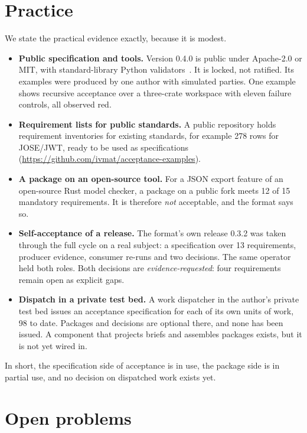 \documentclass[11pt]{article}
\theoremstyle{definition}
\theoremstyle{remark}
\begin{document}
\section{Practice}\label{sec:practice}

We state the practical evidence exactly, because it is modest.
\begin{itemize}[itemsep=1pt]
\item \textbf{Public specification and tools.} Version 0.4.0 is public under Apache-2.0 or MIT,
  with standard-library Python validators~\cite{acceptance040}. It is locked, not ratified. Its
  examples were produced by one author with simulated parties. One example shows recursive
  acceptance over a three-crate workspace with eleven failure controls, all observed red.
\item \textbf{Requirement lists for public standards.} A public repository holds requirement
  inventories for existing standards, for example 278 rows for JOSE/JWT, ready to be used as
  specifications (\url{https://github.com/ivmat/acceptance-examples}).
\item \textbf{A package on an open-source tool.} For a JSON export feature of an open-source Rust
  model checker, a package on a public fork meets 12 of 15 mandatory requirements. It is therefore
  \emph{not} acceptable, and the format says so.
\item \textbf{Self-acceptance of a release.} The format's own release 0.3.2 was taken through the
  full cycle on a real subject: a specification over 13 requirements, producer evidence, consumer
  re-runs and two decisions. The same operator held both roles. Both decisions are
  \emph{evidence-requested}: four requirements remain open as explicit gaps.
\item \textbf{Dispatch in a private test bed.} A work dispatcher in the author's private test bed
  issues an acceptance specification for each of its own units of work, 98 to date. Packages and
  decisions are optional there, and none has been issued. A component that projects briefs and
  assembles packages exists, but it is not yet wired in.
\end{itemize}
In short, the specification side of acceptance is in use, the package side is in partial use, and
no decision on dispatched work exists yet.

\section{Open problems}\label{sec:open}
\end{document}
